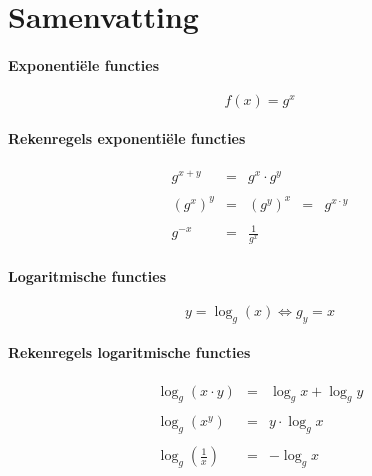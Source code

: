 
\section{Samenvatting}
\paragraph{Exponenti\"ele functies}
\[
  f(x) = g^x
\]
\paragraph{Rekenregels exponenti\"ele functies}
\[
  \begin{array}{rclcl}
    g^{x+y}  & = & g^x \cdot g^y                     \\ \\
    \displaystyle (g^x)^y & = & \displaystyle (g^y)^x           & = & g^{x \cdot y} \\ \\
    \displaystyle g^{-x}   & = & \displaystyle \frac{1}{g^x}
  \end{array}
\]
\paragraph{Logaritmische functies}
\[
  y = \log_g(x) \iff g_y = x
\]
\paragraph{Rekenregels logaritmische functies}
\[
  \begin{array}{rcl}
    \log_g(x \cdot y) & = & \log_g x + \log_g y \\ \\
    \log_g(x^y) & = & y \cdot \log_g x \\ \\
    \displaystyle \log_g(\frac1x) & = & -\log_g x
  \end{array}
\]




